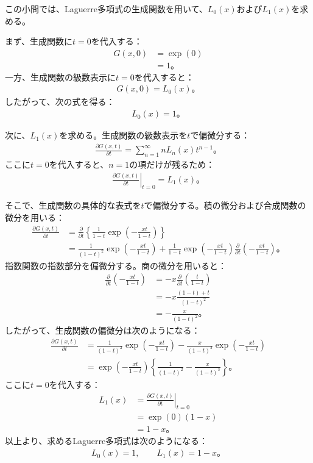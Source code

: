 \documentclass[platex,dvipdfmx,a4paper]{jsarticle}
\newcommand{\hb}[2]{\frac{\partial #1}{\partial #2}}
\begin{document}
  この小問では、Laguerre多項式の生成関数を用いて、$L_0(x)$および$L_1(x)$を求める。

  まず、生成関数に$t=0$を代入する：
  \begin{align*}
    G(x,0)
    &=\exp(0)\\
    &=1。
  \end{align*}
  一方、生成関数の級数表示に$t=0$を代入すると：
  \begin{align*}
    G(x,0)=L_0(x)。
  \end{align*}
  したがって、次の式を得る：
  \begin{align*}
    L_0(x)=1。
  \end{align*}

  次に、$L_1(x)$を求める。生成関数の級数表示を$t$で偏微分する：
  \begin{align*}
    \hb{G(x,t)}{t}
    =\sum_{n=1}^{\infty}nL_n(x)t^{n-1}。
  \end{align*}
  ここに$t=0$を代入すると、$n=1$の項だけが残るため：
  \begin{align*}
    \left.\hb{G(x,t)}{t}\right|_{t=0}=L_1(x)。
  \end{align*}

  そこで、生成関数の具体的な表式を$t$で偏微分する。積の微分および合成関数の微分を用いる：
  \begin{align*}
    \hb{G(x,t)}{t}
    &=
    \hb{}{t}\left\{
      \frac{1}{1-t}\exp\left(-\frac{xt}{1-t}\right)
    \right\}\\
    &=
    \frac{1}{(1-t)^2}\exp\left(-\frac{xt}{1-t}\right)
    +\frac{1}{1-t}\exp\left(-\frac{xt}{1-t}\right)
    \hb{}{t}\left(-\frac{xt}{1-t}\right)。
  \end{align*}
  指数関数の指数部分を偏微分する。商の微分を用いると：
  \begin{align*}
    \hb{}{t}\left(-\frac{xt}{1-t}\right)
    &=-x\hb{}{t}\left(\frac{t}{1-t}\right)\\
    &=-x\frac{(1-t)+t}{(1-t)^2}\\
    &=-\frac{x}{(1-t)^2}。
  \end{align*}
  したがって、生成関数の偏微分は次のようになる：
  \begin{align*}
    \hb{G(x,t)}{t}
    &=
    \frac{1}{(1-t)^2}\exp\left(-\frac{xt}{1-t}\right)
    -\frac{x}{(1-t)^3}\exp\left(-\frac{xt}{1-t}\right)\\
    &=
    \exp\left(-\frac{xt}{1-t}\right)
    \left\{\frac{1}{(1-t)^2}-\frac{x}{(1-t)^3}\right\}。
  \end{align*}
  ここに$t=0$を代入する：
  \begin{align*}
    L_1(x)
    &=\left.\hb{G(x,t)}{t}\right|_{t=0}\\
    &=\exp(0)(1-x)\\
    &=1-x。
  \end{align*}
  以上より、求めるLaguerre多項式は次のようになる：
  \begin{align*}
    L_0(x)=1,
    \qquad
    L_1(x)=1-x。
  \end{align*}
\end{document}

